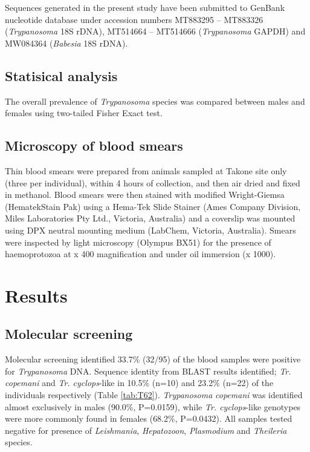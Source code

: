 \documentclass[a4paper, nobind]{templates/ociamthesis}
\begin{document}
Sequences generated in the present study have been submitted to GenBank nucleotide database under accession numbers MT883295 -- MT883326 (\emph{Trypanosoma} 18S rDNA), MT514664 -- MT514666 (\emph{Trypanosoma} GAPDH) and MW084364 (\emph{Babesia} 18S rDNA).

\hypertarget{statisical-analysis}{%
\subsection{Statisical analysis}\label{statisical-analysis}}

The overall prevalence of \emph{Trypanosoma} species was compared between males and females using two-tailed Fisher Exact test.

\hypertarget{microscopy-of-blood-smears}{%
\subsection{Microscopy of blood smears}\label{microscopy-of-blood-smears}}

Thin blood smears were prepared from animals sampled at Takone site only (three per individual), within 4 hours of collection, and then air dried and fixed in methanol. Blood smears were then stained with modified Wright-Giemsa (Hematek\textregistered Stain Pak) using a Hema-Tek Slide Stainer (Ames Company Division, Miles Laboratories Pty Ltd., Victoria, Australia) and a coverslip was mounted using DPX neutral mounting medium (LabChem, Victoria, Australia). Smears were inspected by light microscopy (Olympus BX51) for the presence of haemoprotozoa at x 400 magnification and under oil immersion (x 1000).

\hypertarget{results-2}{%
\section{Results}\label{results-2}}

\hypertarget{molecular-screening-1}{%
\subsection{Molecular screening}\label{molecular-screening-1}}

Molecular screening identified 33.7\% (32/95) of the blood samples were positive for \emph{Trypanosoma} DNA. Sequence identity from BLAST results identified; \emph{Tr. copemani} and \emph{Tr. cyclops}-like in 10.5\% (n=10) and 23.2\% (n=22) of the individuals respectively (Table \ref{tab:T62}). \emph{Trypanosoma} \emph{copemani} was identified almost exclusively in males (90.0\%, P=0.0159), while \emph{Tr. cyclops}-like genotypes were more commonly found in females (68.2\%, P=0.0432). All samples tested negative for presence of \emph{Leishmania}, \emph{Hepatozoon}, \emph{Plasmodium} and \emph{Theileria} species.
\end{document}
